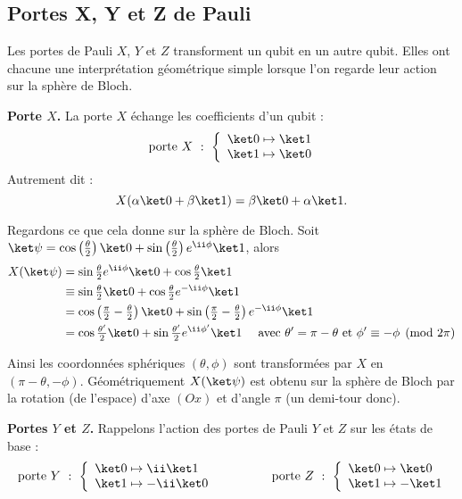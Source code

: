 \documentclass[11pt,class=report,crop=false]{standalone}
\renewcommand{\commentfigure}[1]{#1} %
\begin{document}
\subsection{Portes X, Y et Z de Pauli}


Les portes de Pauli $X$, $Y$ et $Z$ transforment un qubit en un autre qubit.
Elles ont chacune une interprétation géométrique simple lorsque l'on regarde leur action sur la sphère de Bloch.

\textbf{Porte $X$.}
La porte $X$ échange les coefficients d'un qubit :
$$
\text{ porte } X \ : \ 
\left\lbrace
\begin{array}{l}
\ket 0 \mapsto \ket1 \\
\ket 1 \mapsto \ket0
\end{array}\right.
$$
Autrement dit :
$$X(\alpha\ket0+\beta\ket1) = \beta\ket0+\alpha\ket1.$$


Regardons ce que cela donne sur la sphère de Bloch.
Soit $\ket\psi = \cos\left(\frac\theta2\right) \ket0 + \sin\left(\frac\theta2\right)e^{\ii\phi}\ket1$, alors
\begin{align*}
X(\ket\psi) 
  &= \sin\tfrac\theta2e^{\ii\phi}\ket0 + \cos\tfrac\theta2 \ket1 \\
  &\equiv \sin\tfrac\theta2 \ket0 +  \cos\tfrac\theta2 e^{-\ii\phi}\ket1 \\
  &= \cos\left(\tfrac\pi2-\tfrac\theta2\right)\ket0 + \sin\left(\tfrac\pi2-\tfrac\theta2\right)e^{-\ii\phi}\ket1 \\
  &=  \cos\tfrac{\theta'}2 \ket0 + \sin\tfrac{\theta'}2e^{\ii\phi'}\ket1 \quad \text{ avec } \theta' = \pi-\theta \text{ et } \phi'\equiv-\phi \pmod{2\pi}\\
\end{align*}

Ainsi les coordonnées sphériques $(\theta,\phi)$ sont transformées par $X$ en $(\pi-\theta,-\phi)$.
Géométriquement $X(\ket\psi)$ est obtenu sur la sphère de Bloch par la rotation (de l'espace) d'axe $(Ox)$ et d'angle $\pi$ (un demi-tour donc).
\commentfigure{
\myfigure{1}{
\tikzinput{bloch04a}
} 
}


\textbf{Portes $Y$ et $Z$.}
Rappelons l'action des portes de Pauli $Y$ et $Z$ sur les états de base :
$$\text{ porte } Y \ : \ \left\lbrace
\begin{array}{l}
\ket 0 \mapsto \ii\ket 1 \\
\ket 1 \mapsto -\ii\ket 0
\end{array}\right.
\qquad\qquad
\text{ porte } Z  \ : \ 
\left\lbrace
\begin{array}{l}
\ket 0 \mapsto \ket0 \\
\ket 1 \mapsto -\ket1
\end{array}\right.$$
\end{document}
